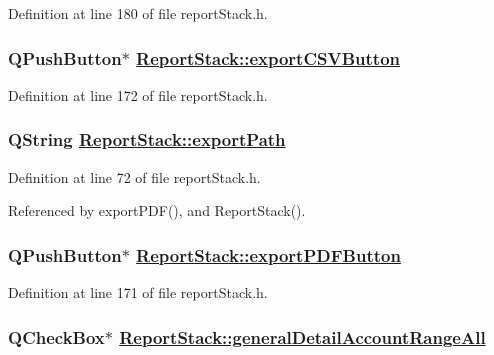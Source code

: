 Definition at line 180 of file report\-Stack.h.\hypertarget{classReportStack_r92}{
\subsubsection[exportCSVButton]{\setlength{\rightskip}{0pt plus 5cm}QPush\-Button$\ast$ \hyperlink{classReportStack_r92}{Report\-Stack::export\-CSVButton}}}
\label{classReportStack_r92}


Definition at line 172 of file report\-Stack.h.\hypertarget{classReportStack_r4}{
\subsubsection[exportPath]{\setlength{\rightskip}{0pt plus 5cm}QString \hyperlink{classReportStack_r4}{Report\-Stack::export\-Path}}}
\label{classReportStack_r4}


Definition at line 72 of file report\-Stack.h.

Referenced by export\-PDF(), and Report\-Stack().\hypertarget{classReportStack_r91}{
\subsubsection[exportPDFButton]{\setlength{\rightskip}{0pt plus 5cm}QPush\-Button$\ast$ \hyperlink{classReportStack_r91}{Report\-Stack::export\-PDFButton}}}
\label{classReportStack_r91}


Definition at line 171 of file report\-Stack.h.\hypertarget{classReportStack_r30}{
\subsubsection[generalDetailAccountRangeAll]{\setlength{\rightskip}{0pt plus 5cm}QCheck\-Box$\ast$ \hyperlink{classReportStack_r30}{Report\-Stack::general\-Detail\-Account\-Range\-All}}}
\label{classReportStack_r30}


